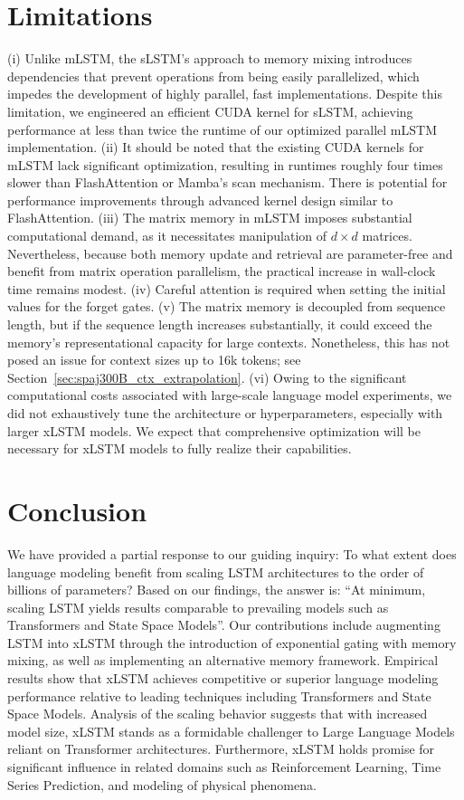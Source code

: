 \section{Limitations}

(i) Unlike mLSTM, the sLSTM’s approach to memory mixing introduces dependencies that prevent operations from being easily parallelized, which impedes the development of highly parallel, fast implementations. Despite this limitation, we engineered an efficient CUDA kernel for sLSTM, achieving performance at less than twice the runtime of our optimized parallel mLSTM implementation. (ii) It should be noted that the existing CUDA kernels for mLSTM lack significant optimization, resulting in runtimes roughly four times slower than FlashAttention or Mamba’s scan mechanism. There is potential for performance improvements through advanced kernel design similar to FlashAttention. (iii) The matrix memory in mLSTM imposes substantial computational demand, as it necessitates manipulation of $d \times d$ matrices. Nevertheless, because both memory update and retrieval are parameter-free and benefit from matrix operation parallelism, the practical increase in wall-clock time remains modest. (iv) Careful attention is required when setting the initial values for the forget gates. (v) The matrix memory is decoupled from sequence length, but if the sequence length increases substantially, it could exceed the memory’s representational capacity for large contexts. Nonetheless, this has not posed an issue for context sizes up to 16k tokens; see Section~\ref{sec:spaj300B_ctx_extrapolation}. (vi) Owing to the significant computational costs associated with large-scale language model experiments, we did not exhaustively tune the architecture or hyperparameters, especially with larger xLSTM models. We expect that comprehensive optimization will be necessary for xLSTM models to fully realize their capabilities.

\section{Conclusion}
We have provided a partial response to our guiding inquiry: To what extent does language modeling benefit from scaling LSTM architectures to the order of billions of parameters? Based on our findings, the answer is: ``At minimum, scaling LSTM yields results comparable to prevailing models such as Transformers and State Space Models''. Our contributions include augmenting LSTM into xLSTM through the introduction of exponential gating with memory mixing, as well as implementing an alternative memory framework. Empirical results show that xLSTM achieves competitive or superior language modeling performance relative to leading techniques including Transformers and State Space Models. Analysis of the scaling behavior suggests that with increased model size, xLSTM stands as a formidable challenger to Large Language Models reliant on Transformer architectures. Furthermore, xLSTM holds promise for significant influence in related domains such as Reinforcement Learning, Time Series Prediction, and modeling of physical phenomena.

